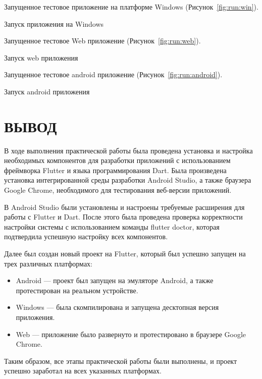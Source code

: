 Запущенное тестовое приложение на платформе Windows (Рисунок~\ref{fig:run:win}).

\begin{image}
	\caption{Запуск приложения на Windows}
	\label{fig:run:win}
\end{image}

\clearpage

Запущенное тестовое Web приложение (Рисунок~\ref{fig:run:web}).

\begin{image}
	\caption{Запуск web приложения}
	\label{fig:run:web}
\end{image}

\clearpage

Запущенное тестовое android приложение (Рисунок~\ref{fig:run:android}).

\begin{image}
	\caption{Запуск android приложения}
	\label{fig:run:android}
\end{image}
\clearpage


\section*{ВЫВОД}

В ходе выполнения практической работы была проведена установка
и настройка необходимых компонентов для разработки приложений
с использованием фреймворка Flutter и языка программирования Dart.
Была произведена установка интегрированной среды разработки Android Studio,
а также браузера Google Chrome,
необходимого для тестирования веб-версии приложений.\par
В Android Studio были установлены и настроены требуемые расширения
для работы с Flutter и Dart.
После этого была проведена проверка корректности настройки системы
с использованием команды flutter doctor,
которая подтвердила успешную настройку всех компонентов.\par
Далее был создан новый проект на Flutter,
который был успешно запущен на трех различных платформах:

\begin{itemize}
	\item Android --- проект был запущен на эмуляторе Android,
	а также протестирован на реальном устройстве.
	\item Windows --- была скомпилирована
	и запущена десктопная версия приложения.
	\item Web --- приложение было развернуто
	и протестировано в браузере Google Chrome.
\end{itemize}

Таким образом, все этапы практической работы были выполнены, и проект успешно заработал на всех указанных платформах.
